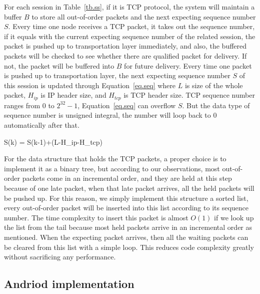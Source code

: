 For each session in Table~\ref{tb.ss}, if it is TCP protocol, the system will maintain a buffer $B$ to store all out-of-order packets and the next expecting sequence number $S$. Every time one node receives a TCP packet, it takes out the sequence number, if it equals with the current expecting sequence number of the related session, the packet is pushed up to transportation layer immediately, and also, the buffered packets will be checked to see whether there are qualified packet for delivery. If not, the packet will be buffered into $B$ for future delivery. Every time one packet is pushed up to transportation layer, the next expecting sequence number $S$ of this session is updated through Equation~\ref{eq.seq} where $L$ is size of the whole packet, $H_{ip}$ is IP header size, and $H_{tcp}$ is TCP header size. TCP sequence number ranges from $0$ to $2^{32}-1$, Equation~\ref{eq.seq} can overflow $S$. But the data type of sequence number is unsigned integral, the number will loop back to $0$ automatically after that. 

\be
\label{eq.seq}
S(k) = S(k-1)+(L-H_{ip}-H_{tcp})
\ee

For the data structure that holds the TCP packets, a proper choice is to implement it as a binary tree, but according to our observations, most out-of-order packets come in an incremental order, and they are held at this step because of one late packet, when that late packet arrives, all the held packets will be pushed up. For this reason, we simply implement this structure a sorted list, every out-of-order packet will be inserted into this list according to its sequence number. The time complexity to insert this packet is almost $O(1)$ if we look up the list from the tail because most held packets arrive in an incremental order as mentioned.
When the expecting packet arrives, then all the waiting packets can be cleared from this list with a simple loop. This reduces code complexity greatly without sacrificing any performance.




\subsection{Andriod implementation}
